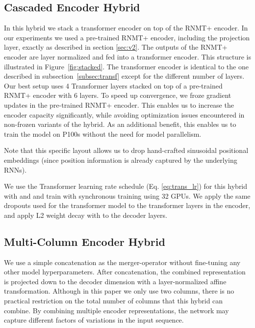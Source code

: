 \documentclass[11pt,a4paper]{article}
\begin{document}
\subsection{Cascaded Encoder Hybrid}
\label{vertical_mixing}

In this hybrid we stack a transformer encoder on top of the RNMT+
encoder. In our experiments we used a pre-trained RNMT+ encoder,
including the projection layer, exactly as described in section
\ref{sec:v2}. The outputs of the RNMT+ encoder are layer normalized
and fed into a transformer encoder.  This structure is illustrated in
Figure~\ref{fig:stacked}. The transformer encoder is identical to the
one described in subsection~\ref{subsec:transf} except for the
different number of layers. Our best setup uses 4 Transformer layers
stacked on top of a pre-trained RNMT+ encoder with 6 layers. To speed
up convergence, we froze gradient updates in the pre-trained RNMT+
encoder. This enables us to increase the encoder capacity
significantly, while avoiding optimization issues encountered in
non-frozen variants of the hybrid. As an additional benefit, this
enables us to train the model on P100s without the need for model
parallelism.

Note that this specific layout allows us to drop hand-crafted sinusoidal
positional embeddings (since position information is already captured by
the underlying RNNs).

We use the Transformer learning rate schedule (Eq. \ref{eq:trans_lr})
for this hybrid with  and  and train with
synchronous training using 32 GPUs. We apply the same dropouts
used for the transformer model to the transformer layers in the
encoder, and apply L2 weight decay with  to the decoder layers.

\subsection{Multi-Column Encoder Hybrid}
\label{horizontal_mixing}

We use a simple concatenation as the merger-operator without
fine-tuning any other model hyperparameters. After
concatenation, the combined representation is projected down to the
decoder dimension with a layer-normalized affine transformation.
Although in this paper we only use two columns, there is no practical
restriction on the total number of columns that this hybrid can
combine. By combining multiple encoder representations, the network
may capture different factors of variations in the input sequence.
\end{document}
